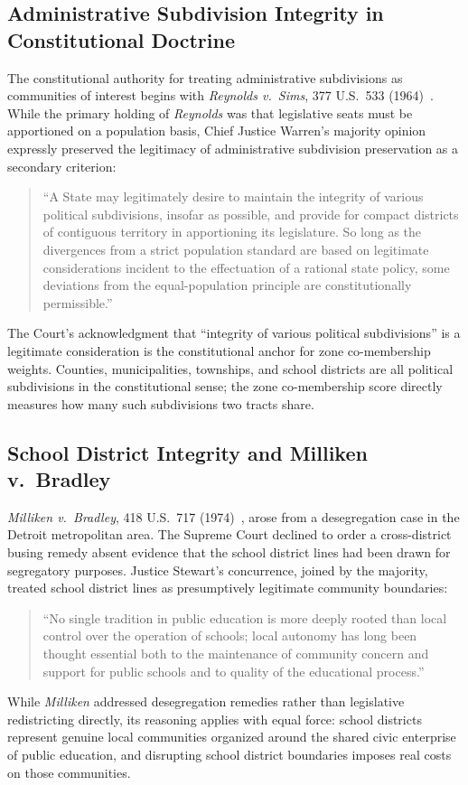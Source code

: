 \label{sec:legal}

\subsection{Administrative Subdivision Integrity in Constitutional Doctrine}

The constitutional authority for treating administrative subdivisions as communities
of interest begins with \textit{Reynolds v.\ Sims}, 377 U.S.\ 533 (1964)~\citep{reynolds1964}.
While the primary holding of \textit{Reynolds} was that legislative seats must be
apportioned on a population basis, Chief Justice Warren's majority opinion expressly
preserved the legitimacy of administrative subdivision preservation as a secondary
criterion:
\begin{quote}
  ``A State may legitimately desire to maintain the integrity of various political
  subdivisions, insofar as possible, and provide for compact districts of contiguous
  territory in apportioning its legislature.
  So long as the divergences from a strict population standard are based on legitimate
  considerations incident to the effectuation of a rational state policy, some
  deviations from the equal-population principle are constitutionally permissible.''
\end{quote}
The Court's acknowledgment that ``integrity of various political subdivisions'' is a
legitimate consideration is the constitutional anchor for zone co-membership weights.
Counties, municipalities, townships, and school districts are all political subdivisions
in the constitutional sense; the zone co-membership score directly measures how many
such subdivisions two tracts share.

\subsection{School District Integrity and Milliken v.\ Bradley}

\textit{Milliken v.\ Bradley}, 418 U.S.\ 717 (1974)~\citep{milliken1974},
arose from a desegregation case in the Detroit metropolitan area.
The Supreme Court declined to order a cross-district busing remedy absent evidence
that the school district lines had been drawn for segregatory purposes.
Justice Stewart's concurrence, joined by the majority, treated school district lines
as presumptively legitimate community boundaries:
\begin{quote}
  ``No single tradition in public education is more deeply rooted than local control
  over the operation of schools; local autonomy has long been thought essential both
  to the maintenance of community concern and support for public schools and to
  quality of the educational process.''
\end{quote}
While \textit{Milliken} addressed desegregation remedies rather than legislative
redistricting directly, its reasoning applies with equal force: school districts
represent genuine local communities organized around the shared civic enterprise of
public education, and disrupting school district boundaries imposes real costs on
those communities.

